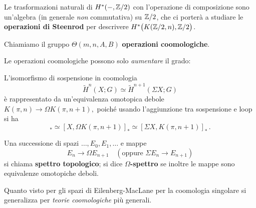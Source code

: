 Le trasformazioni naturali di $H^{*}(-,{\mathbb Z}/2)$
con l'operazione di composizione sono un'algebra 
(in generale \emph{non} commutativa) su ${\mathbb Z}/2$,
che ci porterà a studiare le \textbf{operazioni di Steenrod}
per descrivere $H^{*}\big( K({\mathbb Z}/2,n),{\mathbb Z}/2 \big)$.

\begin{df}
	Chiamiamo il gruppo $\Theta(m,n,A,B)$ \textbf{operazioni coomologiche}.
\end{df}

\begin{oss}
	Le operazioni coomologiche possono solo \emph{aumentare} il grado:
\end{oss}

\begin{oss}
	L'isomorfismo di sospensione in coomologia
	\begin{equation*}
		\widetilde{H}^{n}(X;G) \simeq \widetilde{H}^{n+1}(\Sigma X;G)
	\end{equation*}
	è rappresentato da un'equivalenza omotopica debole
		$K(\pi,n) \to \Omega K(\pi,n+1),$
	poiché usando l'aggiunzione tra sospensione e loop si ha
	\begin{equation*}
		 [X,K(\pi,n)]_{\ast} \simeq  [X,\Omega K(\pi,n+1)]_{\ast} \simeq  [\Sigma X,K(\pi,n+1)]_{\ast}\,.
	\end{equation*}
\end{oss}

\begin{df}
	Una successione di spazi $\dots, E_{0}, E_{1}, \dots$ e mappe
	\begin{equation*}
		E_{n} \longrightarrow \Omega E_{n+1}
		\quad (\text{oppure } \Sigma E_{n} \longrightarrow E_{n+1})
	\end{equation*}
	si chiama \textbf{spettro topologico};
	si dice \textbf{$\Omega$-spettro} se inoltre le mappe sono equivalenze omotopiche deboli.
\end{df}

Quanto visto per gli spazi di Eilenberg-MacLane per la coomologia singolare
si generalizza per \emph{teorie coomologiche} più generali.

